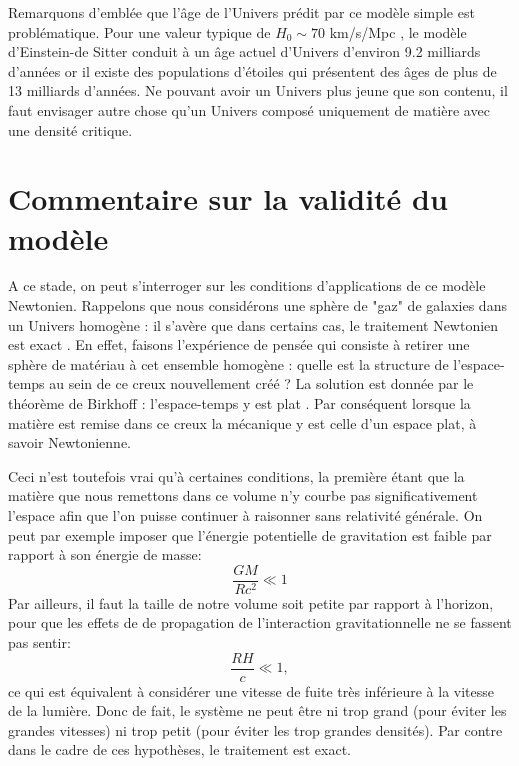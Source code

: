 Remarquons d'emblée que l'âge de l'Univers prédit par ce modèle simple est problématique. Pour une valeur typique de $H_0\sim 70$ km/s/Mpc , le modèle d'Einstein-de Sitter conduit à un âge actuel d'Univers d'environ 9.2 milliards d'années or il existe des populations d'étoiles qui présentent des âges de plus de 13 milliards d'années. Ne pouvant avoir un Univers plus jeune que son contenu, il faut envisager autre chose qu'un Univers composé uniquement de matière avec une densité critique.

\section{Commentaire sur la validité du modèle}
A ce stade, on peut s'interroger sur les conditions d'applications de ce modèle Newtonien. Rappelons que nous considérons une sphère de "gaz" de galaxies dans un Univers homogène : il s'avère que dans certains cas, le traitement Newtonien est exact . En effet, faisons l'expérience de pensée qui consiste à retirer une sphère de matériau à cet ensemble homogène : quelle est la structure de l'espace-temps au sein de ce creux nouvellement créé ? La solution est donnée par le théorème de Birkhoff : l'espace-temps y est plat . Par conséquent lorsque la matière est remise dans ce creux la mécanique y est celle d'un espace plat, à savoir Newtonienne.

Ceci n'est toutefois vrai qu'à certaines conditions, la première étant que la matière que nous remettons dans ce volume n'y courbe pas significativement l'espace afin que l'on puisse continuer à raisonner sans relativité générale. On peut par exemple imposer que l'énergie potentielle de gravitation est faible par rapport à son énergie de masse:
\begin{equation}
\frac{GM}{Rc^2}\ll 1
\end{equation}
Par ailleurs, il faut la taille de notre volume soit petite par rapport à l'horizon, pour que les effets de de propagation de l'interaction gravitationnelle  ne se fassent pas sentir:
\begin{equation}
\frac{RH}{c}\ll 1,
\end{equation}
ce qui est équivalent à considérer une vitesse de fuite très inférieure à la vitesse de la lumière. Donc de fait, le système ne peut être ni trop grand (pour éviter les grandes vitesses) ni trop petit (pour éviter les trop grandes densités). Par contre dans le cadre de ces hypothèses, le traitement est exact.

